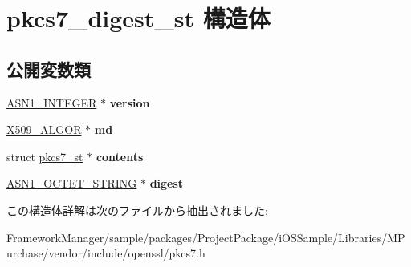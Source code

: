 \hypertarget{structpkcs7__digest__st}{}\section{pkcs7\+\_\+digest\+\_\+st 構造体}
\label{structpkcs7__digest__st}
\subsection*{公開変数類}
\begin{DoxyCompactItemize}
\item 
\hypertarget{structpkcs7__digest__st_ad46797a922e60a6fc3a30e0e694dd7d4}{}\hyperlink{structasn1__string__st}{A\+S\+N1\+\_\+\+I\+N\+T\+E\+G\+E\+R} $\ast$ {\bfseries version}\label{structpkcs7__digest__st_ad46797a922e60a6fc3a30e0e694dd7d4}

\item 
\hypertarget{structpkcs7__digest__st_a76481d96de4d0f8457fe75c6d29131e6}{}\hyperlink{struct_x509__algor__st}{X509\+\_\+\+A\+L\+G\+O\+R} $\ast$ {\bfseries md}\label{structpkcs7__digest__st_a76481d96de4d0f8457fe75c6d29131e6}

\item 
\hypertarget{structpkcs7__digest__st_ac519ce261ee599eaacd0ac4f2f06ebe7}{}struct \hyperlink{structpkcs7__st}{pkcs7\+\_\+st} $\ast$ {\bfseries contents}\label{structpkcs7__digest__st_ac519ce261ee599eaacd0ac4f2f06ebe7}

\item 
\hypertarget{structpkcs7__digest__st_ad75a037194fd4d99c1a5aa180a8e96e8}{}\hyperlink{structasn1__string__st}{A\+S\+N1\+\_\+\+O\+C\+T\+E\+T\+\_\+\+S\+T\+R\+I\+N\+G} $\ast$ {\bfseries digest}\label{structpkcs7__digest__st_ad75a037194fd4d99c1a5aa180a8e96e8}

\end{DoxyCompactItemize}


この構造体詳解は次のファイルから抽出されました\+:\begin{DoxyCompactItemize}
\item 
Framework\+Manager/sample/packages/\+Project\+Package/i\+O\+S\+Sample/\+Libraries/\+M\+Purchase/vendor/include/openssl/pkcs7.\+h\end{DoxyCompactItemize}
